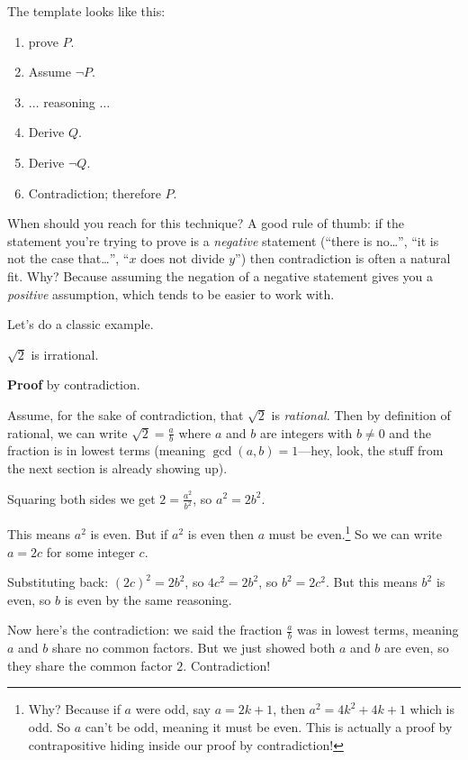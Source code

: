 \documentclass[11pt]{article}
\begin{document}
The template looks like this:
\begin{enumerate}
  \item[\textbf{Goal:}] prove $P$.
  \item Assume $\lnot P$.
  \item $\ldots$ reasoning $\ldots$
  \item Derive $Q$.
  \item Derive $\lnot Q$.
  \item Contradiction; therefore $P$.
\end{enumerate}

When should you reach for this technique? A good rule of thumb: if the statement you're trying to prove is a \emph{negative} statement (``there is no\ldots'', ``it is not the case that\ldots'', ``$x$ does not divide $y$'') then contradiction is often a natural fit. Why? Because assuming the negation of a negative statement gives you a \emph{positive} assumption, which tends to be easier to work with.

Let's do a classic example.

\begin{theorem}
$\sqrt{2}$ is irrational.
\end{theorem}

\textbf{Proof} by contradiction.

Assume, for the sake of contradiction, that $\sqrt{2}$ is \emph{rational}. Then by definition of rational, we can write $\sqrt{2} = \frac{a}{b}$ where $a$ and $b$ are integers with $b \neq 0$ and the fraction is in lowest terms (meaning $\gcd(a,b) = 1$---hey, look, the stuff from the next section is already showing up).

Squaring both sides we get $2 = \frac{a^2}{b^2}$, so $a^2 = 2b^2$.

This means $a^2$ is even. But if $a^2$ is even then $a$ must be even.\footnote{Why? Because if $a$ were odd, say $a = 2k+1$, then $a^2 = 4k^2 + 4k + 1$ which is odd. So $a$ can't be odd, meaning it must be even. This is actually a proof by contrapositive hiding inside our proof by contradiction!} So we can write $a = 2c$ for some integer $c$.

Substituting back: $(2c)^2 = 2b^2$, so $4c^2 = 2b^2$, so $b^2 = 2c^2$. But this means $b^2$ is even, so $b$ is even by the same reasoning.

Now here's the contradiction: we said the fraction $\frac{a}{b}$ was in lowest terms, meaning $a$ and $b$ share no common factors. But we just showed both $a$ and $b$ are even, so they share the common factor $2$. Contradiction!
\end{document}
